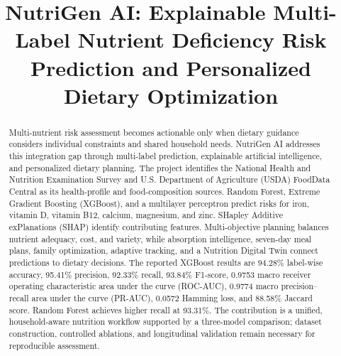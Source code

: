 \documentclass[conference]{IEEEtran}
\begin{document}
\title{NutriGen AI: Explainable Multi-Label Nutrient Deficiency Risk Prediction and Personalized Dietary Optimization}

\author{
\and
{}
\and
{}
\and
{}
}

\maketitle

\begin{abstract}
Multi-nutrient risk assessment becomes actionable only when dietary guidance considers individual constraints and shared household needs. NutriGen AI addresses this integration gap through multi-label prediction, explainable artificial intelligence, and personalized dietary planning. The project identifies the National Health and Nutrition Examination Survey and U.S. Department of Agriculture (USDA) FoodData Central as its health-profile and food-composition sources. Random Forest, Extreme Gradient Boosting (XGBoost), and a multilayer perceptron predict risks for iron, vitamin D, vitamin B12, calcium, magnesium, and zinc. SHapley Additive exPlanations (SHAP) identify contributing features. Multi-objective planning balances nutrient adequacy, cost, and variety, while absorption intelligence, seven-day meal plans, family optimization, adaptive tracking, and a Nutrition Digital Twin connect predictions to dietary decisions. The reported XGBoost results are 94.28\% label-wise accuracy, 95.41\% precision, 92.33\% recall, 93.84\% F1-score, 0.9753 macro receiver operating characteristic area under the curve (ROC-AUC), 0.9774 macro precision–recall area under the curve (PR-AUC), 0.0572 Hamming loss, and 88.58\% Jaccard score. Random Forest achieves higher recall at 93.31\%. The contribution is a unified, household-aware nutrition workflow supported by a three-model comparison; dataset construction, controlled ablations, and longitudinal validation remain necessary for reproducible assessment.
\end{abstract}
\end{document}
